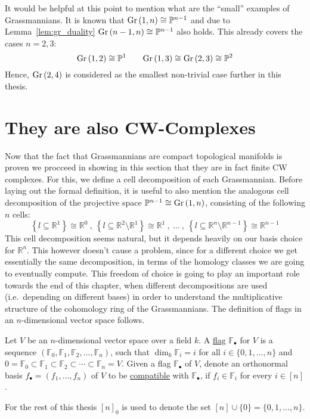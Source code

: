 It would be helpful at this point to mention what are the ``small'' examples of Grassmannians. It is known that $\Gr{1}{n}\cong\mathbb{P}^{n-1}$ and due to Lemma~\ref{lem:gr_duality} $\Gr{n-1}{n}\cong\mathbb{P}^{n-1}$ also holds. This already covers the cases $n=2,3$:
\[\Gr{1}{2}\cong\mathbb{P}^1\qquad\Gr{1}{3}\cong\Gr{2}{3}\cong\mathbb{P}^2\]
Hence, $\Gr{2}{4}$ is considered as the smallest non-trivial case further in this thesis.

\section{They are also CW-Complexes}
Now that the fact that Grassmannians are compact topological manifolds is proven we procceed in showing in this section that they are in fact finite CW complexes.
For this, we define a cell decomposition of each Grassmannian. Before laying out the formal definition, it is useful to also mention the analogous cell decomposition of the projective space $\mathbb{P}^{n-1}\cong\Gr{1}{n}$, consisting of the following $n$ cells:
\[\left\{l\subseteq\mathbb{R}^1\right\}\cong\mathbb{R}^0\ ,\ \left\{l\subseteq\mathbb{R}^2\setminus\mathbb{R}^1\right\}\cong\mathbb{R}^1\ ,\ \ldots\ ,\ \left\{l\subseteq\mathbb{R}^n\setminus\mathbb{R}^{n-1}\right\}\cong\mathbb{R}^{n-1}\]
This cell decomposition seems natural, but it depends heavily on our basis choice for $\mathbb{R}^n$. This however doesn't cause a problem, since for a different choice we get essentially the same decomposition, in terms of the homology classes we are going to eventually compute. This freedom of choice is going to play an important role towards the end of this chapter, when different decompositions are used (i.e.\ depending on different bases) in order to understand the multiplicative structure of the cohomology ring of the Grassmannians. The definition of flags in an $n$-dimensional vector space follows.

\begin{definition} Let $V$ be an $n$-dimensional vector space over a field $k$. A \ul{flag} $\mathbb{F}_{\bullet}$ for $V$ is a sequence $\left(\mathbb{F}_0,\mathbb{F}_1,\mathbb{F}_2,\ldots,\mathbb{F}_n\right)$, such that $\dim_k\mathbb{F}_i = i$ for all $i\in\{0,1,\ldots,n\}$ and
$0=\mathbb{F}_0\subset\mathbb{F}_1\subset\mathbb{F}_2\subset\cdots\subset\mathbb{F}_n=V$.
Given a flag $\mathbb{F}_{\bullet}$ of $V$, denote an orthonormal basis $f_{\bullet}=(f_1,\ldots,f_n)$ of $V$ to be \ul{compatible} with $\mathbb{F}_{\bullet}$, if
$f_i\in\mathbb{F}_i$
for every $i\in[n]$.
\end{definition}
For the rest of this thesis ${[n]}_0$ is used to denote the set $[n]\cup\{0\}=\{0,1,\ldots,n\}$.

